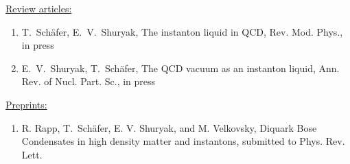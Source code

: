 \underline{Review articles:}
\begin{enumerate}
\setcounter{enumi}{\value{myitem}}

\item{T.~Sch\"afer, E.~V.~Shuryak, The instanton liquid in QCD, 
Rev. Mod. Phys., in press}

\item{E.~V.~Shuryak, T.~Sch\"afer, The QCD vacuum as an instanton 
liquid, Ann. Rev. of Nucl. Part. Sc., in press}

\setcounter{myitem}{\value{enumi}}
\end{enumerate}


\underline{Preprints:}
\begin{enumerate}
\setcounter{enumi}{\value{myitem}}
 
\item{R. Rapp, T.~Sch\"afer, E. V. Shuryak, and M. Velkovsky,
Diquark Bose Condensates in high density matter and instantons, 
submitted to Phys. Rev. Lett.}

\setcounter{myitem}{\value{enumi}}
\end{enumerate}


